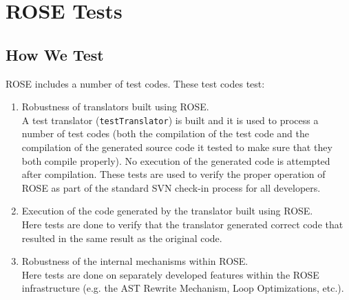 \chapter{ROSE Tests}

\label{tests:introduction}

\section{How We Test}

ROSE includes a number of test codes. These test codes test:
\begin{enumerate}
   \item Robustness of translators built using ROSE. \\
         A test translator ({\tt testTranslator}) is built and it is used to process a number of
         test codes (both the compilation of the test code and the compilation of
         the generated source code it tested to make sure that they both compile
         properly). No execution of the generated code is attempted after compilation.
         These tests are used to verify the proper operation of ROSE as part of
         the standard SVN check-in process for all developers.

   \item Execution of the code generated by the translator built using ROSE. \\
         Here tests are done to verify that the translator generated correct code
         that resulted in the same result as the original code.  

   \item Robustness of the internal mechanisms within ROSE. \\
         Here tests are done on separately developed features within the ROSE
         infrastructure (e.g. the AST Rewrite Mechanism, Loop Optimizations, etc.).
\end{enumerate}

